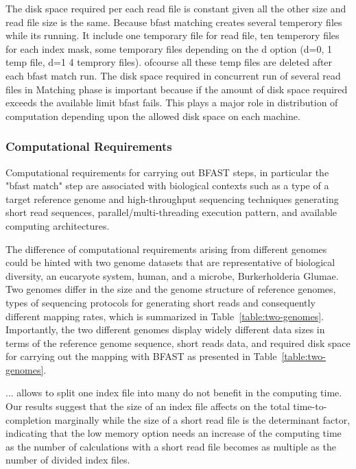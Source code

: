 \documentclass{acm_proc_article-sp}
\begin{document}
The disk space required per each read file is constant given all the other size and read file size is the same. Because bfast matching creates several temperory files while its running. It include one temporary file for read file, ten temperory files for each index mask, some temporary files depending on the d option (d=0, 1 temp file, d=1 4 temprory files). ofcourse all these temp files are deleted after each bfast match run. The disk space required in concurrent run of several read files in Matching phase is important because if the amount of disk space required exceeds the available limit bfast fails. This plays a major role in distribution of computation depending upon the allowed disk space on each machine. 

\subsubsection{Computational Requirements}


Computational requirements for carrying out BFAST steps, in particular
the "bfast match" step are associated with biological contexts such as
a type of a target reference genome and high-throughput sequencing
techniques generating short read sequences, parallel/multi-threading
execution pattern, and available computing architectures.

The difference of computational requirements arising from different
genomes could be hinted with two genome datasets that are
representative of biological diversity, an eucaryote system, human,
and a microbe, Burkerholderia Glumae\cite{kim2011}.  Two genomes
differ in the size and the genome structure of reference genomes,
types of sequencing protocols for generating short reads and
consequently different mapping rates, which is summarized in
Table~\ref{table:two-genomes}.  Importantly, the two different genomes
display widely different data sizes in terms of the reference genome
sequence, short reads data, and required disk space for carrying out
the mapping with BFAST as presented in Table~\ref{table:two-genomes}.

... allows to split one index file into many do not benefit in the
computing time. Our results suggest that the size of an index file
affects on the total time-to-completion marginally while the size of a
short read file is the determinant factor, indicating that the low
memory option needs an increase of the computing time as the number of
calculations with a short read file becomes as multiple as the number
of divided index files.
\end{document}
